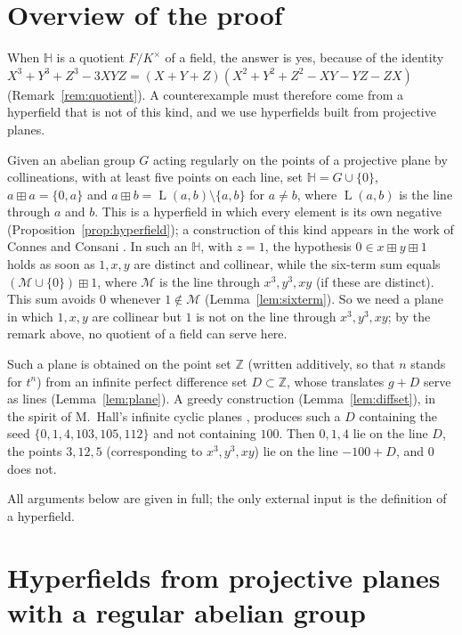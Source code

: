 \documentclass[11pt]{article}
\theoremstyle{definition}
\theoremstyle{remark}
\newcommand{\HH}{\mathbb{H}}
\newcommand{\Z}{\mathbb{Z}}
\newcommand{\bp}{\boxplus}
\DeclareMathOperator{\Ln}{L}
\begin{document}
\section{Overview of the proof}

When $\HH$ is a quotient $F/K^\times$ of a field, the answer is yes, because of the identity $X^3+Y^3+Z^3-3XYZ=(X+Y+Z)(X^2+Y^2+Z^2-XY-YZ-ZX)$ (Remark~\ref{rem:quotient}). A counterexample must therefore come from a hyperfield that is not of this kind, and we use hyperfields built from projective planes.

Given an abelian group $G$ acting regularly on the points of a projective plane by collineations, with at least five points on each line, set $\HH=G\cup\{0\}$, $a\bp a=\{0,a\}$ and $a\bp b=\Ln(a,b)\setminus\{a,b\}$ for $a\neq b$, where $\Ln(a,b)$ is the line through $a$ and $b$. This is a hyperfield in which every element is its own negative (Proposition~\ref{prop:hyperfield}); a construction of this kind appears in the work of Connes and Consani \cite{CC}. In such an $\HH$, with $z=1$, the hypothesis $0\in x\bp y\bp 1$ holds as soon as $1,x,y$ are distinct and collinear, while the six-term sum equals $(\mathcal M\cup\{0\})\bp 1$, where $\mathcal M$ is the line through $x^3,y^3,xy$ (if these are distinct). This sum avoids $0$ whenever $1\notin\mathcal M$ (Lemma~\ref{lem:sixterm}). So we need a plane in which $1,x,y$ are collinear but $1$ is not on the line through $x^3,y^3,xy$; by the remark above, no quotient of a field can serve here.

Such a plane is obtained on the point set $\Z$ (written additively, so that $n$ stands for $t^n$) from an infinite perfect difference set $D\subset\Z$, whose translates $g+D$ serve as lines (Lemma~\ref{lem:plane}). A greedy construction (Lemma~\ref{lem:diffset}), in the spirit of M.~Hall's infinite cyclic planes \cite{Hall}, produces such a $D$ containing the seed $\{0,1,4,103,105,112\}$ and not containing $100$. Then $0,1,4$ lie on the line $D$, the points $3,12,5$ (corresponding to $x^3,y^3,xy$) lie on the line $-100+D$, and $0$ does not.

All arguments below are given in full; the only external input is the definition of a hyperfield.

\section{Hyperfields from projective planes with a regular abelian group}\label{sec:planes}
\end{document}
